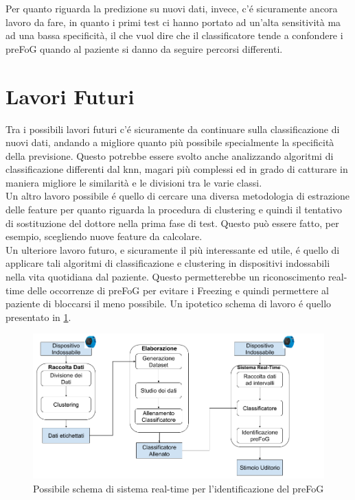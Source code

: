 Per quanto riguarda la predizione su nuovi dati, invece, c'é sicuramente ancora lavoro da fare, in quanto i primi test ci hanno portato ad un'alta sensitività ma ad una bassa specificità, il che vuol dire che il classificatore tende a confondere i preFoG quando al paziente si danno da seguire percorsi differenti.
\section{Lavori Futuri}
Tra i possibili lavori futuri c'é sicuramente da continuare sulla classificazione di nuovi dati, andando a migliore quanto più possibile specialmente la specificità della previsione. Questo potrebbe essere svolto anche analizzando algoritmi di classificazione differenti dal knn, magari più complessi ed in grado di catturare in maniera migliore le similarità e le divisioni tra le varie classi.\\
Un altro lavoro possibile é quello di cercare una diversa metodologia di estrazione delle feature per quanto riguarda la procedura di clustering e quindi il tentativo di sostituzione del dottore nella prima fase di test. Questo può essere fatto, per esempio, scegliendo nuove feature da calcolare.\\
Un ulteriore lavoro futuro, e sicuramente il più interessante ed utile, é quello di applicare tali algoritmi di classificazione e clustering in dispositivi indossabili nella vita quotidiana dal paziente. Questo permetterebbe un riconoscimento real-time delle occorrenze di preFoG per evitare i Freezing e quindi permettere al paziente di bloccarsi il meno possibile. Un ipotetico schema di lavoro é quello presentato in \ref{LavoroFuturo}.

\begin{figure}[]
	\centering
	\includegraphics[scale=0.6,angle=90]{images/LavoroFuturo.png}
	\caption{Possibile schema di sistema real-time per l'identificazione del preFoG}
	\label{LavoroFuturo}
\end{figure}